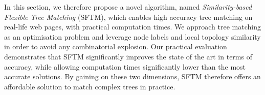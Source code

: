 In this section, we therefore propose a novel algorithm, named \emph{Similarity-based Flexible Tree Matching} (SFTM), which enables high accuracy tree matching on real-life web pages, with practical computation times.
We approach tree matching as an optimisation problem and leverage node labels and local topology similarity in order to avoid any combinatorial explosion.
Our practical evaluation demonstrates that SFTM significantly improves the state of the art in terms of accuracy, while allowing computation times significantly lower than the most accurate solutions.
By gaining on these two dimensions, SFTM therefore offers an affordable solution to match complex trees in practice.

